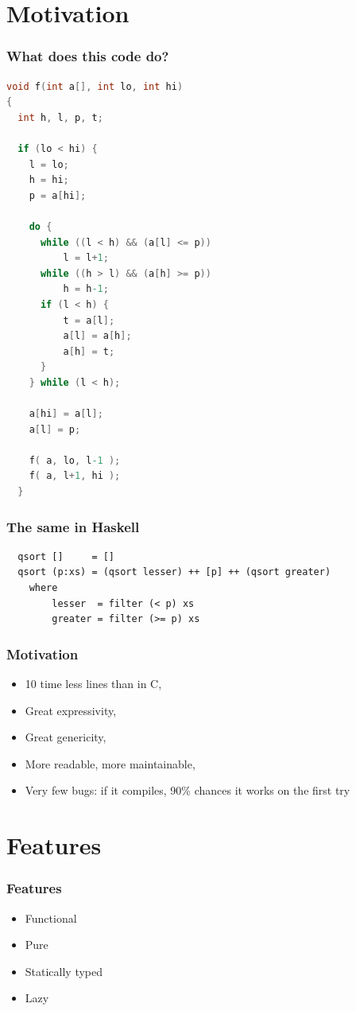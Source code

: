 \documentclass{beamer}
\begin{document}
\section{Motivation}

\begin{frame}[fragile]
\frametitle{What does this code do?}

\begin{lstlisting}[language=C, basicstyle=\tiny]
void f(int a[], int lo, int hi) 
{
  int h, l, p, t;

  if (lo < hi) {
    l = lo;
    h = hi;
    p = a[hi];

    do {
      while ((l < h) && (a[l] <= p)) 
          l = l+1;
      while ((h > l) && (a[h] >= p))
          h = h-1;
      if (l < h) {
          t = a[l];
          a[l] = a[h];
          a[h] = t;
      }
    } while (l < h);

    a[hi] = a[l];
    a[l] = p;

    f( a, lo, l-1 );
    f( a, l+1, hi );
  }
\end{lstlisting}

\end{frame}

\begin{frame}[fragile]
\frametitle{The same in Haskell}

\begin{lstlisting}
  qsort []     = []
  qsort (p:xs) = (qsort lesser) ++ [p] ++ (qsort greater)
    where
        lesser  = filter (< p) xs
        greater = filter (>= p) xs

\end{lstlisting}

\end{frame}

\begin{frame}
\frametitle{Motivation}

 \begin{itemize}
  \item 10 time less lines than in C,
  \item Great expressivity,
  \item Great genericity,
  \item More readable, more maintainable,
  \item Very few bugs: if it compiles, 90\% chances it works on the first try
 \end{itemize}
 
\end{frame}


\section{Features}
\begin{frame}
\frametitle{Features}

 \begin{itemize}
  \item Functional
  \item Pure
  \item Statically typed
  \item Lazy
 \end{itemize}

\end{frame}
\end{document}
